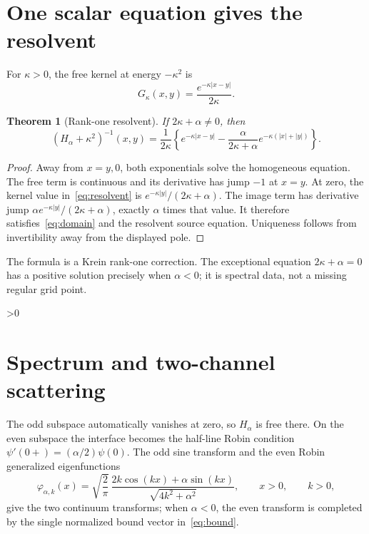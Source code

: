 \documentclass[10pt]{article}
\providecommand{\CRevisionRound}{2}
\newtheorem{theorem}{Theorem}
\begin{document}
\section{One scalar equation gives the resolvent}
For $\kappa>0$, the free kernel at energy $-\kappa^2$ is
\[
 G_\kappa(x,y)=\frac{e^{-\kappa|x-y|}}{2\kappa}.
\]

\begin{theorem}[Rank-one resolvent]\label{thm:resolvent}
If $2\kappa+\alpha\ne0$, then
\begin{equation}\label{eq:resolvent}
 (H_\alpha+\kappa^2)^{-1}(x,y)
 =\frac1{2\kappa}\left\{e^{-\kappa|x-y|}
 -\frac{\alpha}{2\kappa+\alpha}
 e^{-\kappa(|x|+|y|)}\right\}.
\end{equation}
\end{theorem}
\begin{proof}
Away from $x=y,0$, both exponentials solve the homogeneous equation.  The
free term is continuous and its derivative has jump $-1$ at $x=y$.
At zero, the kernel value in~\eqref{eq:resolvent} is
$e^{-\kappa|y|}/(2\kappa+\alpha)$.  The image term has derivative jump
$\alpha e^{-\kappa|y|}/(2\kappa+\alpha)$, exactly $\alpha$ times that value.
It therefore satisfies~\eqref{eq:domain} and the resolvent source equation.
Uniqueness follows from invertibility away from the displayed pole.
\end{proof}

The formula is a Krein rank-one correction.  The exceptional equation
$2\kappa+\alpha=0$ has a positive solution precisely when $\alpha<0$; it is
spectral data, not a missing regular grid point.

\ifnum\CRevisionRound>0
\section{Spectrum and two-channel scattering}
The odd subspace automatically vanishes at zero, so $H_\alpha$ is free there.
On the even subspace the interface becomes the half-line Robin condition
$\psi'(0+)=(\alpha/2)\psi(0)$.  The odd sine transform and the even Robin
generalized eigenfunctions
\[
 \varphi_{\alpha,k}(x)=\sqrt{\frac2\pi}\,
 \frac{2k\cos(kx)+\alpha\sin(kx)}{\sqrt{4k^2+\alpha^2}},
 \qquad x>0,\qquad k>0,
\]
give the two continuum transforms; when $\alpha<0$, the even transform is
completed by the single normalized bound vector in~\eqref{eq:bound}.
\end{document}
